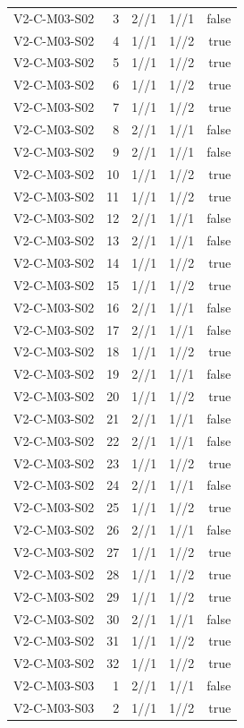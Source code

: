 {\begin{longtable}{lrrrr}
V2-C-M03-S02 & 3 & 2//1 & 1//1 & false \\
V2-C-M03-S02 & 4 & 1//1 & 1//2 & true \\
V2-C-M03-S02 & 5 & 1//1 & 1//2 & true \\
V2-C-M03-S02 & 6 & 1//1 & 1//2 & true \\
V2-C-M03-S02 & 7 & 1//1 & 1//2 & true \\
V2-C-M03-S02 & 8 & 2//1 & 1//1 & false \\
V2-C-M03-S02 & 9 & 2//1 & 1//1 & false \\
V2-C-M03-S02 & 10 & 1//1 & 1//2 & true \\
V2-C-M03-S02 & 11 & 1//1 & 1//2 & true \\
V2-C-M03-S02 & 12 & 2//1 & 1//1 & false \\
V2-C-M03-S02 & 13 & 2//1 & 1//1 & false \\
V2-C-M03-S02 & 14 & 1//1 & 1//2 & true \\
V2-C-M03-S02 & 15 & 1//1 & 1//2 & true \\
V2-C-M03-S02 & 16 & 2//1 & 1//1 & false \\
V2-C-M03-S02 & 17 & 2//1 & 1//1 & false \\
V2-C-M03-S02 & 18 & 1//1 & 1//2 & true \\
V2-C-M03-S02 & 19 & 2//1 & 1//1 & false \\
V2-C-M03-S02 & 20 & 1//1 & 1//2 & true \\
V2-C-M03-S02 & 21 & 2//1 & 1//1 & false \\
V2-C-M03-S02 & 22 & 2//1 & 1//1 & false \\
V2-C-M03-S02 & 23 & 1//1 & 1//2 & true \\
V2-C-M03-S02 & 24 & 2//1 & 1//1 & false \\
V2-C-M03-S02 & 25 & 1//1 & 1//2 & true \\
V2-C-M03-S02 & 26 & 2//1 & 1//1 & false \\
V2-C-M03-S02 & 27 & 1//1 & 1//2 & true \\
V2-C-M03-S02 & 28 & 1//1 & 1//2 & true \\
V2-C-M03-S02 & 29 & 1//1 & 1//2 & true \\
V2-C-M03-S02 & 30 & 2//1 & 1//1 & false \\
V2-C-M03-S02 & 31 & 1//1 & 1//2 & true \\
V2-C-M03-S02 & 32 & 1//1 & 1//2 & true \\
V2-C-M03-S03 & 1 & 2//1 & 1//1 & false \\
V2-C-M03-S03 & 2 & 1//1 & 1//2 & true \\

\end{longtable}}
